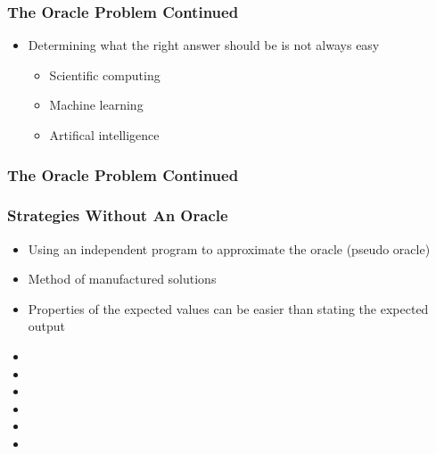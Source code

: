 \documentclass[t,12pt,numbers,fleqn]{beamer}
\begin{document}
\begin{frame}
\frametitle{The Oracle Problem Continued}

\begin{itemize}

\item Determining what the right answer should be is not always easy
\begin{itemize}
\item Scientific computing
\item Machine learning
\item Artifical intelligence
\end{itemize}
\end{itemize}

\end{frame}


\begin{frame}
\frametitle{The Oracle Problem Continued}


\end{frame}


\begin{frame}
\frametitle{Strategies Without An Oracle}

\begin{itemize}

\item Using an independent program to approximate the oracle (pseudo oracle)
\item Method of manufactured solutions
\item Properties of the expected values can be easier than stating the expected
  output
\bi
\item {}
\item {}
\item {}
\item {}
\item {}
\item {}
\ei
\end{itemize}

\end{frame}
\end{document}
